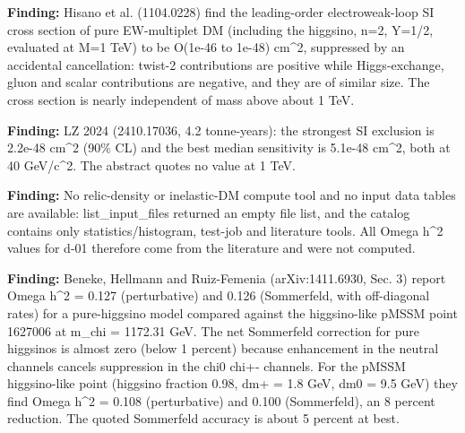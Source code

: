\documentclass[11pt,a4paper]{article}
\begin{document}
\textbf{Finding:} Hisano et al. (1104.0228) find the leading-order electroweak-loop SI cross section of pure EW-multiplet DM (including the higgsino, n=2, Y=1/2, evaluated at M=1 TeV) to be O(1e-46 to 1e-48) cm\textasciicircum{}2, suppressed by an accidental cancellation: twist-2 contributions are positive while Higgs-exchange, gluon and scalar contributions are negative, and they are of similar size. The cross section is nearly independent of mass above about 1 TeV.

\textbf{Finding:} LZ 2024 (2410.17036, 4.2 tonne-years): the strongest SI exclusion is 2.2e-48 cm\textasciicircum{}2 (90\% CL) and the best median sensitivity is 5.1e-48 cm\textasciicircum{}2, both at 40 GeV/c\textasciicircum{}2. The abstract quotes no value at 1 TeV.

\textbf{Finding:} No relic-density or inelastic-DM compute tool and no input data tables are available: list\_input\_files returned an empty file list, and the catalog contains only statistics/histogram, test-job and literature tools. All Omega h\textasciicircum{}2 values for d-01 therefore come from the literature and were not computed.

\textbf{Finding:} Beneke, Hellmann and Ruiz-Femenia (arXiv:1411.6930, Sec. 3) report Omega h\textasciicircum{}2 = 0.127 (perturbative) and 0.126 (Sommerfeld, with off-diagonal rates) for a pure-higgsino model compared against the higgsino-like pMSSM point 1627006 at m\_chi = 1172.31 GeV. The net Sommerfeld correction for pure higgsinos is almost zero (below 1 percent) because enhancement in the neutral channels cancels suppression in the chi0 chi+- channels. For the pMSSM higgsino-like point (higgsino fraction 0.98, dm+ = 1.8 GeV, dm0 = 9.5 GeV) they find Omega h\textasciicircum{}2 = 0.108 (perturbative) and 0.100 (Sommerfeld), an 8 percent reduction. The quoted Sommerfeld accuracy is about 5 percent at best.
\end{document}
